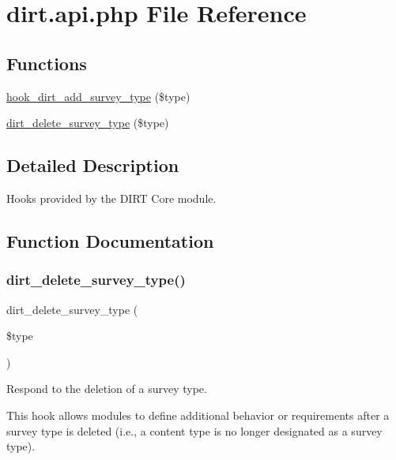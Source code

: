\hypertarget{dirt_8api_8php}{}\section{dirt.\+api.\+php File Reference}
\label{dirt_8api_8php}
\subsection*{Functions}
\begin{DoxyCompactItemize}
\item 
\mbox{\hyperlink{dirt_8api_8php_a04e0b3c0458c02ca470655b669bb16c1}{hook\+\_\+dirt\+\_\+add\+\_\+survey\+\_\+type}} (\$type)
\item 
\mbox{\hyperlink{dirt_8api_8php_a2ed670e45b883464cffce445c3eb5074}{dirt\+\_\+delete\+\_\+survey\+\_\+type}} (\$type)
\end{DoxyCompactItemize}


\subsection{Detailed Description}
Hooks provided by the D\+I\+RT Core module. 

\subsection{Function Documentation}
\mbox{\label{dirt_8api_8php_a2ed670e45b883464cffce445c3eb5074}} 
\subsubsection{\texorpdfstring{dirt\+\_\+delete\+\_\+survey\+\_\+type()}{dirt\_delete\_survey\_type()}}
{\footnotesize\ttfamily dirt\+\_\+delete\+\_\+survey\+\_\+type (\begin{DoxyParamCaption}\item[{}]{\$type }\end{DoxyParamCaption})}

Respond to the deletion of a survey type.

This hook allows modules to define additional behavior or requirements after a survey type is deleted (i.\+e., a content type is no longer designated as a survey type).


